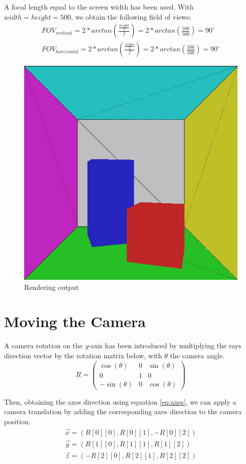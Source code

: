 A focal length equal to the screen width has been used. With $width = height = 500$, we obtain the following field of views:
\begin{equation}
\begin{split}
FOV_{vertical} = 2 * arctan(\frac{\frac{height}{2}}{f}) = 2 * arctan(\frac{500}{500}) = 90^\circ\\
FOV_{horizontal} = 2 * arctan(\frac{\frac{width}{2}}{f}) = 2 * arctan(\frac{500}{500}) = 90^\circ
\end{split}
\end{equation}

\begin{figure}[H]
\centering
\includegraphics[width=0.3\linewidth]{img/init.jpg}
\caption{Rendering output}
\end{figure}

\section{Moving the Camera}
A camera rotation on the \textit{y}-axis has been introduced by multiplying the rays direction vector by the rotation matrix below, with $\theta$ the camera angle.
\begin{equation}
R = \left( \begin{array}{ccc}
\cos(\theta) & 0 & \sin(\theta) \\
0 & 1 & 0 \\
-\sin(\theta) & 0 & \cos(\theta) \end{array} \right)
\end{equation}

Then, obtaining the axes direction using equation \ref{eq:axes}, we can apply a camera translation by adding the corresponding axes direction to the camera position.
\begin{equation}
\label{eq:axes}
\begin{split}
\vec{x} = ( R[0][0], R[0][1], - R[0][2] )\\
\vec{y} = ( R[1][0], R[1][1], R[1][2] )\\
\vec{z} = ( - R[2][0], R[2][1], R[2][2] )
\end{split}
\end{equation}

